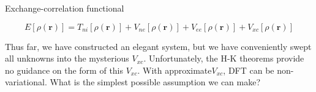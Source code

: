 \documentclass[aspectratio=169]{beamer}
\let \vec \mathbf
\begin{document}
    \begin{frame}{Exchange-correlation functional}

        \begin{equation*}
            E[\rho(\vec{r})] = T_{ni}[\rho(\vec{r})] + V_{ne}[\rho(\vec{r})] + V_{ee}[\rho(\vec{r})] + V_{xc}[\rho(\vec{r})]
        \end{equation*}

        Thus far, we have constructed an elegant system, but we have conveniently swept all unknowns into the mysterious $V_{xc}$. Unfortunately, the H-K theorems provide no guidance on the form of this $V_{xc}$. With approximate$V_{xc}$, DFT can be non-variational.\newline
        \newline
        What is the simplest possible assumption we can make?
    \end{frame}
\end{document}

